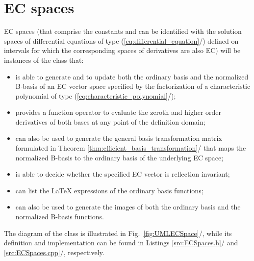 \documentclass[b5paper, twosided]{book}
\newcommand{\CBlue}[1]{{\color[rgb]{0.0, 0.0, 0.9}{#1}}}
\DeclareRobustCommand{\mref}[1]{\ref{#1}{\relsize{-1}/\pageref{#1}}}
\begin{document}
\section{EC spaces}
EC spaces (that comprise the constants and can be identified with the solution spaces of differential equations of type (\mref{eq:differential_equation}) defined on intervals for which the corresponding spaces of derivatives are also EC) will be instances of the class \CBlue{ECSpace} that:
\begin{itemize}
\item
is able to generate and to update both the ordinary basis and the normalized B-basis of an EC vector space specified by the factorization of a characteristic polynomial of type (\mref{eq:characteristic_polynomial});
\item
provides a function operator to evaluate the zeroth and higher order derivatives of both bases at any point of the definition domain;
\item
can also be used to generate the general basis transformation matrix formulated in Theorem \mref{thm:efficient_basis_transformation} that maps the normalized B-basis to the ordinary basis of the underlying EC space;
\item
is able to decide whether the specified EC vector is reflection invariant; 
\item
can list the \LaTeX{} expressions of the ordinary basis functions; 
\item
can also be used to generate the images of both the ordinary basis and the normalized B-basis functions.
\end{itemize}
The diagram of the class is illustrated in Fig.\ \mref{fig:UMLECSpace}, while its definition and implementation can be found in Listings \mref{src:ECSpaces.h} and \mref{src:ECSpaces.cpp}, respectively.
\end{document}
